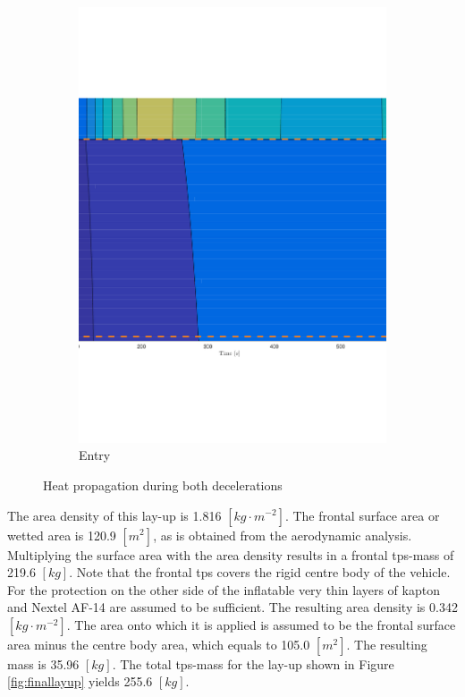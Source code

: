 \begin{figure}
\begin{subfigure}[b]{0.45\textwidth}
		\includegraphics[width=\textwidth]{./Figure/Thermal/Thermal_contour_entry}
		\caption{Entry}
		\label{fig:thermoentry}
	\end{subfigure}
	\caption{Heat propagation during both decelerations}\label{fig:heatprop}
\end{figure}

The area density of this lay-up is 1.816 $\left[kg\cdot m^{-2}\right]$. The frontal surface area or wetted area is 120.9 $\left[m^2\right]$, as is obtained from the aerodynamic analysis. Multiplying the surface area with the area density results in a frontal \gls{tps}-mass of 219.6 $\left[kg\right]$. Note that the frontal \gls{tps} covers the rigid centre body of the vehicle. For the protection on the other side of the inflatable very thin layers of kapton and Nextel AF-14 are assumed to be sufficient. The resulting area density is 0.342 $\left[kg\cdot m^{-2}\right]$. The area onto which it is applied is assumed to be the frontal surface area minus the centre body area, which equals to 105.0 $\left[m^2\right]$. The resulting mass is 35.96 $\left[kg\right]$. The total \gls{tps}-mass for the lay-up shown in Figure \ref{fig:finallayup} yields 255.6 $\left[kg\right]$. 

